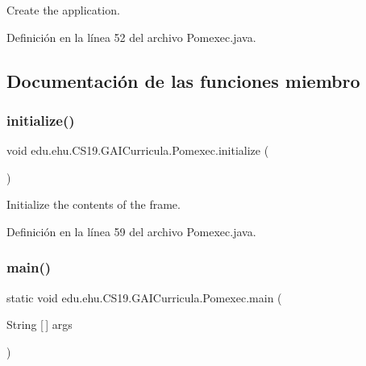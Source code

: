 Create the application. 



Definición en la línea 52 del archivo Pomexec.\+java.



\subsection{Documentación de las funciones miembro}
\mbox{\label{classedu_1_1ehu_1_1_c_s19_1_1_g_a_i_curricula_1_1_pomexec_ab89003495509c2f11da18c9675828571}} 
\subsubsection{\texorpdfstring{initialize()}{initialize()}}
{\footnotesize\ttfamily void edu.\+ehu.\+C\+S19.\+G\+A\+I\+Curricula.\+Pomexec.\+initialize (\begin{DoxyParamCaption}{ }\end{DoxyParamCaption})\hspace{0.3cm}{\ttfamily [private]}}



Initialize the contents of the frame. 



Definición en la línea 59 del archivo Pomexec.\+java.

\mbox{\label{classedu_1_1ehu_1_1_c_s19_1_1_g_a_i_curricula_1_1_pomexec_a52ecabe81c9c3180cdccb3749b6553d6}} 
\subsubsection{\texorpdfstring{main()}{main()}}
{\footnotesize\ttfamily static void edu.\+ehu.\+C\+S19.\+G\+A\+I\+Curricula.\+Pomexec.\+main (\begin{DoxyParamCaption}\item[{String \mbox{[}$\,$\mbox{]}}]{args }\end{DoxyParamCaption})\hspace{0.3cm}{\ttfamily [static]}}



